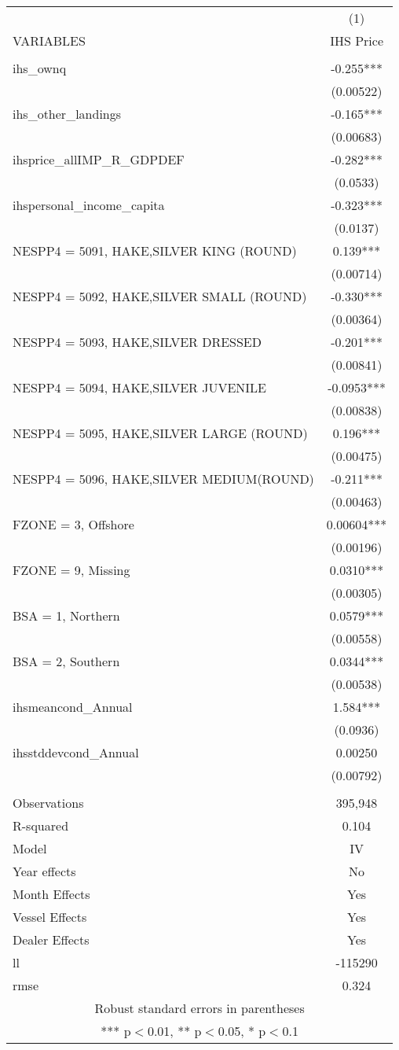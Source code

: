 \begin{tabular}{lc} \hline
 & (1) \\
VARIABLES & IHS Price \\ \hline
 &  \\
ihs\_ownq & -0.255*** \\
 & (0.00522) \\
ihs\_other\_landings & -0.165*** \\
 & (0.00683) \\
ihsprice\_allIMP\_R\_GDPDEF & -0.282*** \\
 & (0.0533) \\
ihspersonal\_income\_capita & -0.323*** \\
 & (0.0137) \\
NESPP4 = 5091, HAKE,SILVER KING (ROUND) & 0.139*** \\
 & (0.00714) \\
NESPP4 = 5092, HAKE,SILVER SMALL (ROUND) & -0.330*** \\
 & (0.00364) \\
NESPP4 = 5093, HAKE,SILVER DRESSED & -0.201*** \\
 & (0.00841) \\
NESPP4 = 5094, HAKE,SILVER JUVENILE & -0.0953*** \\
 & (0.00838) \\
NESPP4 = 5095, HAKE,SILVER LARGE (ROUND) & 0.196*** \\
 & (0.00475) \\
NESPP4 = 5096, HAKE,SILVER MEDIUM(ROUND) & -0.211*** \\
 & (0.00463) \\
FZONE = 3, Offshore & 0.00604*** \\
 & (0.00196) \\
FZONE = 9, Missing & 0.0310*** \\
 & (0.00305) \\
BSA = 1, Northern & 0.0579*** \\
 & (0.00558) \\
BSA = 2, Southern & 0.0344*** \\
 & (0.00538) \\
ihsmeancond\_Annual & 1.584*** \\
 & (0.0936) \\
ihsstddevcond\_Annual & 0.00250 \\
 & (0.00792) \\
 &  \\
Observations & 395,948 \\
R-squared & 0.104 \\
Model & IV \\
Year effects & No \\
Month Effects & Yes \\
Vessel Effects & Yes \\
Dealer Effects & Yes \\
ll & -115290 \\
 rmse & 0.324 \\ \hline
\multicolumn{2}{c}{ Robust standard errors in parentheses} \\
\multicolumn{2}{c}{ *** p$<$0.01, ** p$<$0.05, * p$<$0.1} \\
\end{tabular}
